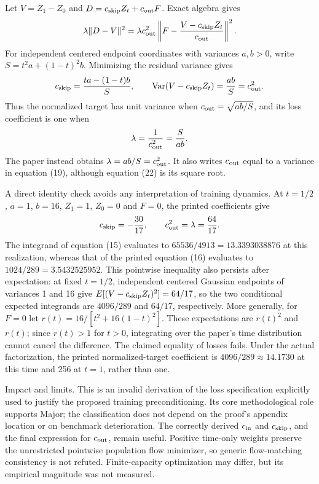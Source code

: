 \documentclass[10pt]{article}
\begin{document}
Let \(V=Z_1-Z_0\) and \(D=c_{\rm skip}Z_t+c_{\rm out}F\). Exact algebra gives \[\lambda\|D-V\|^2
 =\lambda c_{\rm out}^2
 \left\|F-\frac{V-c_{\rm skip}Z_t}{c_{\rm out}}\right\|^2.\] For independent centered endpoint coordinates with variances \(a,b>0\), write \(S=t^2a+(1-t)^2b\). Minimizing the residual variance gives \[c_{\rm skip}=\frac{ta-(1-t)b}{S},\qquad
 \operatorname{Var}(V-c_{\rm skip}Z_t)=\frac{ab}{S}
 =c_{\rm out}^2.\] Thus the normalized target has unit variance when \(c_{\rm out}=\sqrt{ab/S}\), and its loss coefficient is one when \[\lambda=\frac1{c_{\rm out}^2}=\frac{S}{ab}.\] The paper instead obtains \(\lambda=ab/S=c_{\rm out}^2\). It also writes \(c_{\rm out}\) equal to a variance in equation (19), although equation (22) is its square root.\par
A direct identity check avoids any interpretation of training dynamics. At \(t=1/2\), \(a=1\), \(b=16\), \(Z_1=1\), \(Z_0=0\) and \(F=0\), the printed coefficients give \[c_{\rm skip}=-\frac{30}{17},\qquad
 c_{\rm out}^2=\lambda=\frac{64}{17}.\] The integrand of equation (15) evaluates to \(65536/4913=13.3393038876\) at this realization, whereas that of the printed equation (16) evaluates to \(1024/289=3.5432525952\). This pointwise inequality also persists after expectation: at fixed \(t=1/2\), independent centered Gaussian endpoints of variances 1 and 16 give \(E[(V-c_{\rm skip}Z_t)^2]=64/17\), so the two conditional expected integrands are \(4096/289\) and \(64/17\), respectively. More generally, for \(F=0\) let \(r(t)=16/[t^2+16(1-t)^2]\). These expectations are \(r(t)^2\) and \(r(t)\); since \(r(t)>1\) for \(t>0\), integrating over the paper’s time distribution cannot cancel the difference. The claimed equality of losses fails. Under the actual factorization, the printed normalized-target coefficient is \(4096/289\approx14.1730\) at this time and 256 at \(t=1\), rather than one.\par
Impact and limits. This is an invalid derivation of the loss specification explicitly used to justify the proposed training preconditioning. Its core methodological role supports Major; the classification does not depend on the proof’s appendix location or on benchmark deterioration. The correctly derived \(c_{\rm in}\) and \(c_{\rm skip}\), and the final expression for \(c_{\rm out}\), remain useful. Positive time-only weights preserve the unrestricted pointwise population flow minimizer, so generic flow-matching consistency is not refuted. Finite-capacity optimization may differ, but its empirical magnitude was not measured.\par
\end{document}
